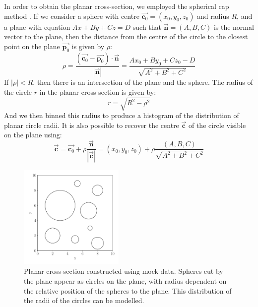 \documentclass[journal]{IEEEtran}
\begin{document}
In order to obtain the planar cross-section, we employed the spherical cap
method \cite{Sykes1922}. If we consider a sphere with centre
$\overrightarrow{\textbf{c}_0} = (x_0, y_0, z_0)$ and radius $R$, and a plane
with equation $Ax + By + Cz = D$ such that $\overrightarrow{\textbf{n}} = (A, B,
C)$ is the normal vector to the plane, then the distance from the centre of the
circle to the closest point on the plane $\overrightarrow{\textbf{p}_0}$ is given by $\rho$:
\begin{equation*}
\rho = \frac{(\overrightarrow{\textbf{c}_0} - \overrightarrow{\textbf{p}_0}) \cdot{}
  \overrightarrow{\textbf{n}}}{|\overrightarrow{\textbf{n}}|} = \frac{Ax_0 +
  By_0 + Cz_0 - D}{\sqrt{A^2 + B^2 + C^2}}
\end{equation*}
If $|\rho| < R$, then there is an intersection of the plane and the sphere. The
radius of the circle $r$ in the planar cross-section is given by:
\begin{equation*}
r = \sqrt{R^2 - \rho^2}
\end{equation*}
And we then binned this radius to produce a histogram of the distribution of
planar circle radii. It is also possible to recover the centre
$\overrightarrow{\textbf{c}}$ of the circle visible on the plane using:
\begin{equation*}
\overrightarrow{\textbf{c}} = \overrightarrow{\textbf{c}_0} +
\rho\frac{\overrightarrow{\textbf{n}}}{|\overrightarrow{\textbf{c}}|} = (x_0,
y_0, z_0) + \rho\frac{(A, B, C)}{\sqrt{A^2 + B^2 + C^2}}
\end{equation*}

\begin{figure}%
\begin{center}
\includegraphics[width=0.45\textwidth]{images/circles.pdf}
\caption{Planar cross-section constructed using mock data. Spheres cut by the
  plane appear as circles on the plane, with radius dependent on the relative
  position of the spheres to the plane. This distribution of the radii of the
  circles can be modelled.}\label{fig:circles}
\end{center}
\end{figure}
\end{document}
